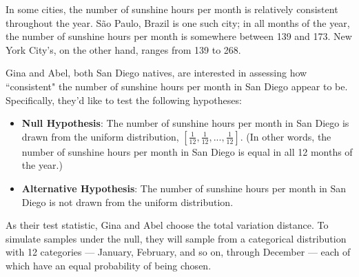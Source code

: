 \begin{prob}[(11 pts)]

In some cities, the number of sunshine hours per month is relatively consistent throughout the year. São Paulo, Brazil is one such city; in all months of the year, the number of sunshine hours per month is somewhere between 139 and 173. New York City's, on the other hand, ranges from 139 to 268.

Gina and Abel, both San Diego natives, are interested in assessing how ``consistent" the number of sunshine hours per month in San Diego appear to be. Specifically, they'd like to test the following hypotheses:

\begin{itemize}
    \item \textbf{Null Hypothesis}: The number of sunshine hours per month in San Diego is drawn from the uniform distribution, $\left[\frac{1}{12}, \frac{1}{12}, ..., \frac{1}{12}\right]$. (In other words, the number of sunshine hours per month in San Diego is equal in all 12 months of the year.) 
    \item \textbf{Alternative Hypothesis}: The number of sunshine hours per month in San Diego is not drawn from the uniform distribution.
\end{itemize}

As their test statistic, Gina and Abel choose the total variation distance. To simulate samples under the null, they will sample from a categorical distribution with 12 categories --- January, February, and so on, through December --- each of which have an equal probability of being chosen.


\begin{subprobset}




\end{subprobset}
\end{prob}
